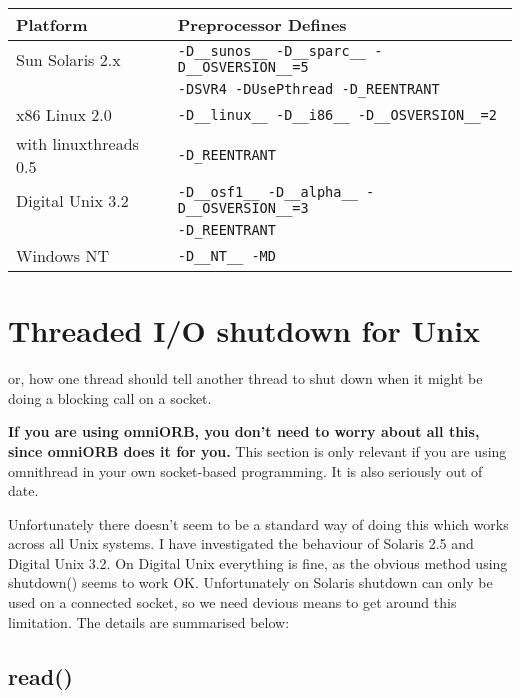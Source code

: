 \documentclass[11pt,twoside,a4paper]{article}
\begin{document}
\vspace{.5\baselineskip}

\begin{tabular}{|l|l|} \hline
Platform & Preprocessor Defines \\ \hline \hline

Sun Solaris 2.x & \verb|-D__sunos__ -D__sparc__ -D__OSVERSION__=5| \\
 & \verb|-DSVR4 -DUsePthread -D_REENTRANT| \\ \hline

x86 Linux 2.0 & \verb|-D__linux__ -D__i86__ -D__OSVERSION__=2| \\
with linuxthreads 0.5 & \verb|-D_REENTRANT| \\ \hline

Digital Unix 3.2 & \verb|-D__osf1__ -D__alpha__ -D__OSVERSION__=3| \\
 & \verb|-D_REENTRANT| \\ \hline

Windows NT & \verb|-D__NT__ -MD| \\ \hline
\end{tabular}



\section{Threaded I/O shutdown for Unix}

or, how one thread should tell another thread to shut down when it
might be doing a blocking call on a socket.

\textbf{If you are using omniORB, you don't need to worry about all
this, since omniORB does it for you.}  This section is only relevant
if you are using omnithread in your own socket-based programming. It
is also seriously out of date.

Unfortunately there doesn't seem to be a standard way of doing this
which works across all Unix systems.  I have investigated the
behaviour of Solaris 2.5 and Digital Unix 3.2.  On Digital Unix
everything is fine, as the obvious method using shutdown() seems to
work OK.  Unfortunately on Solaris shutdown can only be used on a
connected socket, so we need devious means to get around this
limitation.  The details are summarised below:


\subsection{read()}
\end{document}
